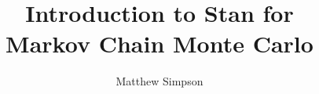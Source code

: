\documentclass[xcolor=dvipsnames]{beamer}
\title[Intro to Stan]{Introduction to Stan for \\
Markov Chain Monte Carlo}
\author[Matt Simpson]{Matthew Simpson}
\institute[Mizzou Statistics]{Department of Statistics, University of Missouri}
\begin{document}
\begin{frame}
\titlepage
\end{frame}

\end{document}
